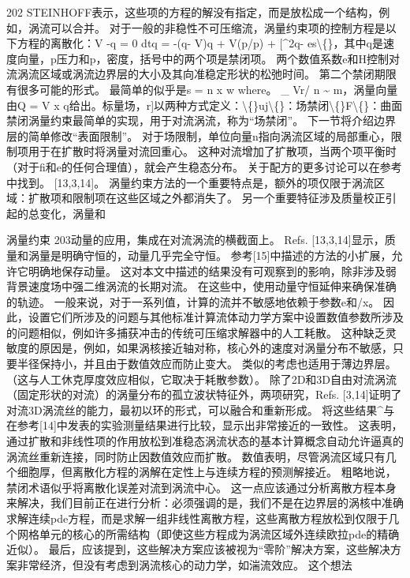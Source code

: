 \documentclass[UTF8,11pt,a4paper,openany,fontset=fandol]{ctexbook}
\begin{document}
202 STEINHOFF表示，这些项的方程的解没有指定，而是放松成一个结构，例如，涡流可以合并。 对于一般的非稳性不可压缩流，涡量约束项的控制方程是以下方程的离散化：V -q = 0 dtq = -(q- V)q + V(p/p) + [\textasciicircum{}2q- es\textbackslash\{\}，其中q是速度向量，p压力和p，密度，括号中的两个项是禁闭项。 两个数值系数e和H控制对流涡流区域或涡流边界层的大小及其向准稳定形状的松弛时间。 第二个禁闭期限有很多可能的形式。 最简单的似乎是s = n x w where。 \_ Vr/ n \textasciitilde{} m，涡量向量由Q = V x q给出。标量场，r]以两种方式定义：\textbackslash\{\}uj\textbackslash\{\}：场禁闭\textbackslash\{\}F\textbackslash\{\}：曲面禁闭涡量约束最简单的实现，用于对流涡流，称为“场禁闭”。 下一节将介绍边界层的简单修改“表面限制”。 对于场限制，单位向量n指向涡流区域的局部重心，限制项用于在扩散时将涡量对流回重心。 这种对流增加了扩散项，当两个项平衡时（对于fi和e的任何合理值），就会产生稳态分布。 关于配方的更多讨论可以在参考中找到。 [13,3,14]。 涡量约束方法的一个重要特点是，额外的项仅限于涡流区域：扩散项和限制项在这些区域之外都消失了。 另一个重要特征涉及质量校正引起的总变化，涡量和

涡量约束 203动量的应用，集成在对流涡流的横截面上。 Refs. [13,3,14]显示，质量和涡量是明确守恒的，动量几乎完全守恒。 参考[15]中描述的方法的小扩展，允许它明确地保存动量。 这对本文中描述的结果没有可观察到的影响，除非涉及弱背景速度场中强二维涡流的长期对流。 在这些中，使用动量守恒延伸来确保准确的轨迹。 一般来说，对于一系列值，计算的流并不敏感地依赖于参数e和/x。 因此，设置它们所涉及的问题与其他标准计算流体动力学方案中设置数值参数所涉及的问题相似，例如许多捕获冲击的传统可压缩求解器中的人工耗散。 这种缺乏灵敏度的原因是，例如，如果涡核接近轴对称，核心外的速度对涡量分布不敏感，只要半径保持小，并且由于数值效应而防止变大。 类似的考虑也适用于薄边界层。 （这与人工休克厚度效应相似，它取决于耗散参数）。 除了2D和3D自由对流涡流（固定形状的对流）的涡量分布的孤立波状特征外，两项研究，Refs. [3,14]证明了对流3D涡流丝的能力，最初以环的形式，可以融合和重新形成。 将这些结果\textasciicircum{}与在参考[14]中发表的实验测量结果进行比较，显示出非常接近的一致性。 这表明，通过扩散和非线性项的作用放松到准稳态涡流状态的基本计算概念自动允许逼真的涡流丝重新连接，同时防止因数值效应而扩散。 数值表明，尽管涡流区域只有几个细胞厚，但离散化方程的涡解在定性上与连续方程的预测解接近。 粗略地说，禁闭术语似乎将离散化误差对流到涡流中心。 这一点应该通过分析离散方程本身来解决，我们目前正在进行分析：必须强调的是，我们不是在边界层的涡核中准确求解连续pde方程，而是求解一组非线性离散方程，这些离散方程放松到仅限于几个网格单元的核心的所需结构（即使这些方程成为涡流区域外连续欧拉pde的精确近似）。 最后，应该提到，这些解决方案应该被视为“零阶”解决方案，这些解决方案非常经济，但没有考虑到涡流核心的动力学，如湍流效应。 这个想法
\end{document}
